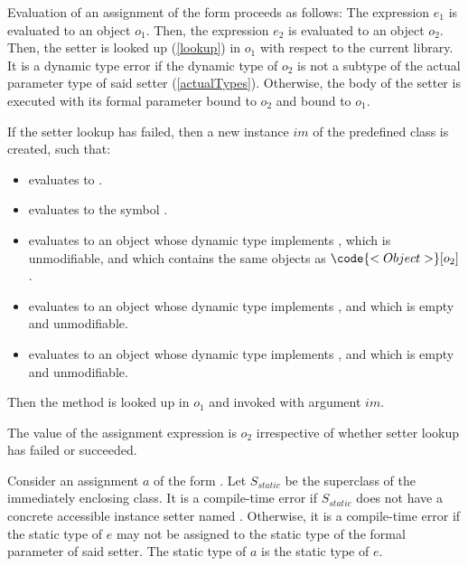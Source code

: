 \documentclass[makeidx]{article}
\begin{document}
{\LMHash{}%
Evaluation of an assignment of the form 
proceeds as follows:
The expression $e_1$ is evaluated to an object $o_1$.
Then, the expression $e_2$ is evaluated to an object $o_2$.
Then, the setter  is looked up (\ref{lookup})
in $o_1$ with respect to the current library.
It is a dynamic type error if the dynamic type of $o_2$
is not a subtype of the actual parameter type of said setter
(\ref{actualTypes}).
Otherwise, the body of the setter is executed with
its formal parameter bound to $o_2$ and \THIS{} bound to $o_1$.

\LMHash{}%
If the setter lookup has failed, then a new instance $im$ of
the predefined class  is created, such that:

\begin{itemize}
\item {} evaluates to \TRUE.
\item {} evaluates to the symbol .
\item {} evaluates to an object
  whose dynamic type implements ,
  which is unmodifiable, and which contains the same objects as
  $\code{<Object>}[o_2]$.
\item {} evaluates to an object
  whose dynamic type implements ,
  and which is empty and unmodifiable.
\item {} evaluates to an object
  whose dynamic type implements ,
  and which is empty and unmodifiable.
\end{itemize}

\LMHash{}%
Then the method  is looked up in $o_1$
and invoked with argument $im$.


\LMHash{}%
The value of the assignment expression is $o_2$
irrespective of whether setter lookup has failed or succeeded.
\EndCase

\LMHash{}%
Consider an assignment $a$ of the form .
Let $S_{static}$ be the superclass of the immediately enclosing class.
It is a compile-time error if $S_{static}$ does not have
a concrete accessible instance setter named .
Otherwise, it is a compile-time error if the static type of $e$
may not be assigned to the static type of the formal parameter of said setter.
The static type of $a$ is the static type of $e$.

}
\end{document}

